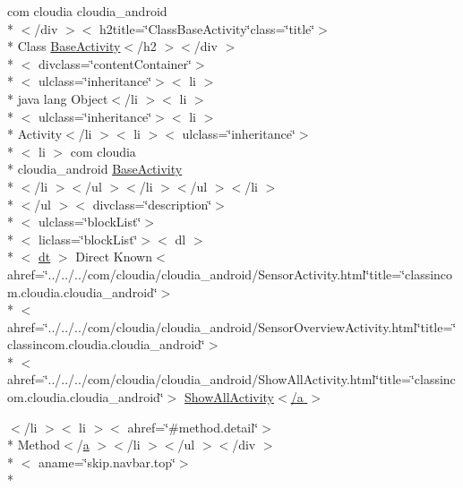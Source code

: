 \begin{DoxyCompactItemize}
 com cloudia cloudia\-\_\-android\\*
$<$/div $>$$<$ h2title=\char`\"{}Class\-Base\-Activity\char`\"{}class=\char`\"{}title\char`\"{}$>$\\*
 Class \hyperlink{index-2_8html_a61e95a6a9edfa0964ff3438abd1581e4}{Base\-Activity}$<$/h2 $>$$<$/div $>$\\*
$<$ divclass=\char`\"{}content\-Container\char`\"{}$>$\\*
$<$ ulclass=\char`\"{}inheritance\char`\"{}$>$$<$ li $>$\\*
 java lang Object$<$/li $>$$<$ li $>$\\*
$<$ ulclass=\char`\"{}inheritance\char`\"{}$>$$<$ li $>$\\*
 Activity$<$/li $>$$<$ li $>$$<$ ulclass=\char`\"{}inheritance\char`\"{}$>$\\*
$<$ li $>$ com cloudia \\*
cloudia\-\_\-android \hyperlink{index-2_8html_a61e95a6a9edfa0964ff3438abd1581e4}{Base\-Activity}\\*
$<$/li $>$$<$/ul $>$$<$/li $>$$<$/ul $>$$<$/li $>$\\*
$<$/ul $>$$<$ divclass=\char`\"{}description\char`\"{}$>$\\*
$<$ ulclass=\char`\"{}block\-List\char`\"{}$>$\\*
$<$ liclass=\char`\"{}block\-List\char`\"{}$>$$<$ dl $>$\\*
$<$ \hyperlink{stylesheet_8css_a107565fb4039d33b041380d6e0ea1d80}{dt} $>$ Direct Known$<$ ahref=\char`\"{}../../../com/cloudia/cloudia\-\_\-android/Sensor\-Activity.\-html\char`\"{}title=\char`\"{}classincom.\-cloudia.\-cloudia\-\_\-android\char`\"{}$>$\\*
$<$ ahref=\char`\"{}../../../com/cloudia/cloudia\-\_\-android/Sensor\-Overview\-Activity.\-html\char`\"{}title=\char`\"{}classincom.\-cloudia.\-cloudia\-\_\-android\char`\"{}$>$\\*
$<$ ahref=\char`\"{}../../../com/cloudia/cloudia\-\_\-android/Show\-All\-Activity.\-html\char`\"{}title=\char`\"{}classincom.\-cloudia.\-cloudia\-\_\-android\char`\"{}$>$ \hyperlink{_base_activity_8html_ac60c75b5acba2007167647a1d60f82d8}{Show\-All\-Activity$<$/a $>$}
\item 
$<$/li $>$$<$ li $>$$<$ ahref=\char`\"{}\#method.\-detail\char`\"{}$>$\\*
 Method$<$/\hyperlink{style_8css_a5e8981582017bb8b84c21f148345d1f7}{a} $>$$<$/li $>$$<$/ul $>$$<$/div $>$\\*
$<$ aname=\char`\"{}skip.\-navbar.\-top\char`\"{}$>$\\*

\end{DoxyCompactItemize}
